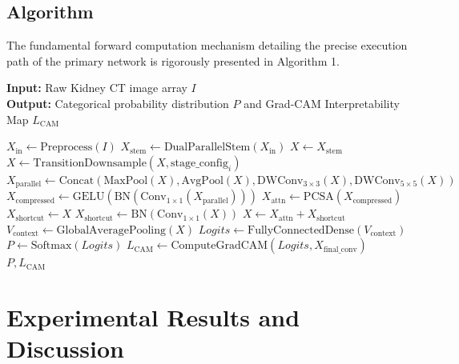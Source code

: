 \documentclass[]{elsarticle}
\begin{document}
\subsection{Algorithm}
The fundamental forward computation mechanism detailing the precise execution path of the primary network is rigorously presented in Algorithm 1.

\begin{algorithm}[H]
\caption{Forward Propagation of the PCSA-KidneyNeXt Network}
\textbf{Input:} Raw Kidney CT image array $I$ \\
\textbf{Output:} Categorical probability distribution $P$ and Grad-CAM Interpretability Map $L_{\text{CAM}}$
\begin{algorithmic}[1]
\State $X_{\text{in}} \leftarrow \text{Preprocess}(I)$ 
\State $X_{\text{stem}} \leftarrow \text{DualParallelStem}(X_{\text{in}})$
\State $X \leftarrow X_{\text{stem}}$
 
    \State $X \leftarrow \text{TransitionDownsample}(X, \text{stage\_config}_i)$
        \State $X_{\text{parallel}} \leftarrow \text{Concat}(\text{MaxPool}(X), \text{AvgPool}(X), \text{DWConv}_{3\times 3}(X), \text{DWConv}_{5\times 5}(X))$
        \State $X_{\text{compressed}} \leftarrow \text{GELU}(\text{BN}(\text{Conv}_{1\times1}(X_{\text{parallel}})))$
        \State $X_{\text{attn}} \leftarrow \text{PCSA}(X_{\text{compressed}})$
            \State $X_{\text{shortcut}} \leftarrow X$
        \Else
            \State $X_{\text{shortcut}} \leftarrow \text{BN}(\text{Conv}_{1\times1}(X))$
        \EndIf
        \State $X \leftarrow X_{\text{attn}} + X_{\text{shortcut}}$
    \EndFor
\EndFor
\State $V_{\text{context}} \leftarrow \text{GlobalAveragePooling}(X)$
\State $Logits \leftarrow \text{FullyConnectedDense}(V_{\text{context}})$
\State $P \leftarrow \text{Softmax}(Logits)$
\State $L_{\text{CAM}} \leftarrow \text{ComputeGradCAM}(Logits, X_{\text{final\_conv}})$
\State \Return $P, L_{\text{CAM}}$
\end{algorithmic}
\label{alg:pcsa_forward}
\end{algorithm}

\section{Experimental Results and Discussion}
\end{document}
